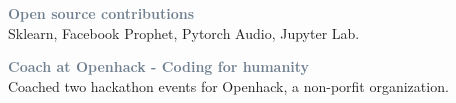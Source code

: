 
\textcolor{SlateGrey}{\textbf{Open source contributions}} \\ Sklearn, Facebook Prophet, Pytorch Audio, Jupyter Lab.
\newline


\textcolor{SlateGrey}{\textbf{Coach at Openhack - Coding for humanity}} \\ Coached two hackathon events for Openhack, a non-porfit organization.




